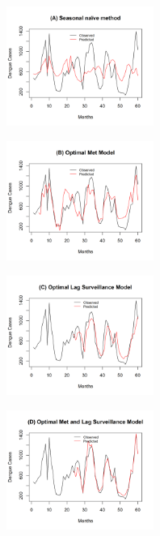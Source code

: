 \documentclass{bmcart}
\begin{document}
\begin{figure}[htbp]
	\begin{minipage}[c]{1.0\textwidth}
		\vspace*{\fill}
		\centering
		\includegraphics[width=9cm,height=3.9cm]{Pred-SeasonalNaive}
		\label{fig:testnaive}\par\vfill
		\includegraphics[width=9cm,height=3.9cm]{Pred-MetOptimal}
		\label{fig:lolo:test1}\par\vfill
		\includegraphics[width=9cm,height=3.9cm]{Pred-OptimalLag}
		\label{fig:test2} \par\vfill
		\includegraphics[width=9cm,height=3.9cm]{Pred-Met-OptimalLag}

\end{minipage}
\end{figure}
\end{document}
